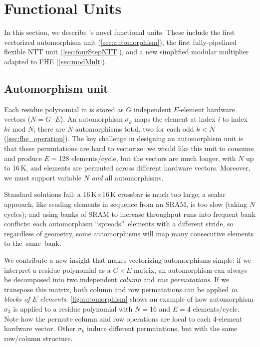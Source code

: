 \chapter{Functional Units}
\label{sec:FUs}

In this section, we describe \name's novel functional units.
These include the first vectorized automorphism unit (\autoref{sec:automorphism}),
the first fully-pipelined flexible NTT unit (\autoref{sec:fourStepNTT}),
and a new simplified modular multiplier adapted to FHE (\autoref{sec:modMult}).

\section{Automorphism unit}\label{sec:automorphism}

\figAutomorphism
Each residue polynomial in \name is stored as $G$ independent $E$-element hardware vectors ($N=G\cdot E$).
An automorphism $\sigma_k$ maps the element at index $i$ to index $ki \textrm{ mod } N$;
there are $N$ automorphisms total, two for each odd $k < N$ (\autoref{sec:fhe_operation}).
The key challenge in designing an automorphism unit is that these permutations are hard to vectorize:
we would like this unit to consume and produce $E=$128 elements/cycle, but the vectors
are much longer, with $N$ up to 16\,K, and elements are permuted across different hardware vectors.
Moreover, we must support variable $N$ \emph{and} all automorphisms.

Standard solutions fail: a 16\,K$\times$16\,K crossbar is much too large;
a scalar approach, like reading elements in sequence from an SRAM, is too slow (taking $N$ cycles);
and using banks of SRAM to increase throughput runs into frequent bank conflicts:
each automorphism ``spreads''~elements with a different stride, so regardless of geometry,
some automorphisms will map many consecutive elements to the~same~bank.

We contribute a new insight that makes vectorizing automorphisms simple:
if we interpret a residue polynomial as a $G \times E$ matrix,
an automorphism can always be decomposed into two independent \emph{column} and \emph{row permutations}.
If we transpose this matrix, both column and row permutations can 
\figautfu
be applied \emph{in blocks of $E$ elements}. \autoref{fig:automorphism} shows an example 
of how automorphism $\sigma_3$ is applied to a residue polynomial
with $N=16$ and $E=4$ elements/cycle.
Note how the permute column and row operations are local to each $4$-element hardware vector.
Other $\sigma_k$ induce different permutations, but with the same row/column structure.



